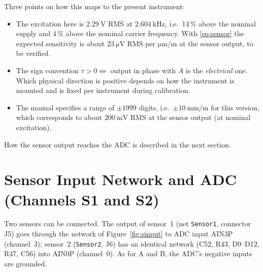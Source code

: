 \documentclass[11pt,a4paper]{article}
\begin{document}
Three points on how this maps to the present instrument:
\begin{itemize}
  \item The excitation here is $\SI{2.29}{\volt}$ RMS at
        $\SI{2.604}{\kilo\hertz}$, i.e.\ 14\,\% above the nominal supply
        and 4\,\% above the nominal carrier frequency.  With
        \eqref{eq:sensor} the expected sensitivity is about
        $\SI{23}{\micro\volt}$ RMS per $\si{\micro\metre\per\metre}$ at
        the sensor output, to be verified.
  \item The sign convention $\tau>0 \Leftrightarrow$ output in phase with
        $A$ is the \emph{electrical} one.  Which physical direction is
        positive depends on how the instrument is mounted and is fixed per
        instrument during calibration.
  \item The manual specifies a range of $\pm1999$ digits, i.e.\
        $\pm\SI{10}{\milli\metre\per\metre}$ for this version, which
        corresponds to about $\SI{200}{\milli\volt}$ RMS at the sensor
        output (at nominal excitation).
\end{itemize}

How the sensor output reaches the ADC is described in the next section.

\section{Sensor Input Network and ADC (Channels S1 and S2)}

Two sensors can be connected.  The output of sensor~1 (net \texttt{Sensor1},
connector J5) goes through the network of Figure~\ref{fig:sinput} to ADC
input AIN3P (channel~3); sensor~2 (\texttt{Sensor2}, J6) has an identical
network (C52, R43, D9--D12, R47, C56) into AIN0P (channel~0).  As for A and B,
the ADC's negative inputs are grounded.
\end{document}
